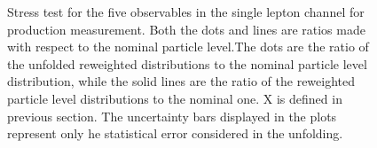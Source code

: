 \begin{figure}[ht]
  \caption{Stress test for the five observables in the single lepton channel for \tty production measurement. Both the dots and lines are ratios made with respect to the nominal particle level.The dots are the ratio of the unfolded reweighted distributions to the nominal particle level distribution, while the solid lines are the ratio of the reweighted particle level distributions to the nominal one. X is defined in previous section. The uncertainty bars displayed in the plots represent only he statistical error considered in the unfolding.}
  \label{fig:unfolded_ljet_dist_stress_test}
\end{figure}
\FloatBarrier


